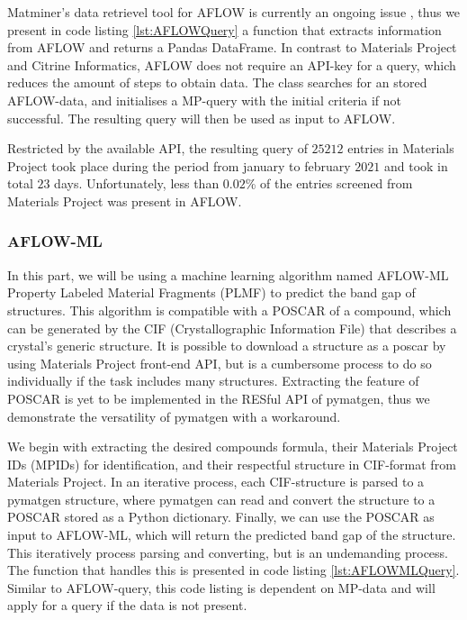 Matminer's data retrievel tool for AFLOW is currently an ongoing issue \cite{Rosenbrock2017}, thus we present in code listing \ref{lst:AFLOWQuery} a function that extracts information from AFLOW and returns a Pandas DataFrame. In contrast to Materials Project and Citrine Informatics, AFLOW does not require an API-key for a query, which reduces the amount of steps to obtain data. The class searches for an stored AFLOW-data, and initialises a MP-query with the initial criteria if not successful. The resulting query will then be used as input to AFLOW.



Restricted by the available API, the resulting query of $25212$ entries in Materials Project took place during the period from january to february $2021$ and took in total $23$ days. Unfortunately, less than $0.02$\% of the entries screened from Materials Project was present in AFLOW.

\subsubsection{AFLOW-ML}

In this part, we will be using a machine learning algorithm named AFLOW-ML Property Labeled Material Fragments (PLMF) \cite{Isayev2017} to predict the band gap of structures. This algorithm is compatible with a POSCAR of a compound, which can be generated by the CIF (Crystallographic Information File) that describes a crystal's generic structure. It is possible to download a structure as a poscar by using Materials Project front-end API, but is a cumbersome process to do so individually if the task includes many structures. Extracting the feature of POSCAR is yet to be implemented in the RESful API of pymatgen, thus we demonstrate the versatility of pymatgen with a workaround.

We begin with extracting the desired compounds formula, their Materials Project IDs (MPIDs) for identification, and their respectful structure in CIF-format from Materials Project. In an iterative process, each CIF-structure is parsed to a pymatgen structure, where pymatgen can read and convert the structure to a POSCAR stored as a Python dictionary. Finally, we can use the POSCAR as input to AFLOW-ML, which will return the predicted band gap of the structure. This iteratively process parsing and converting, but is an undemanding process. The function that handles this is presented in code listing \ref{lst:AFLOWMLQuery}. Similar to AFLOW-query, this code listing is dependent on MP-data and will apply for a query if the data is not present.

